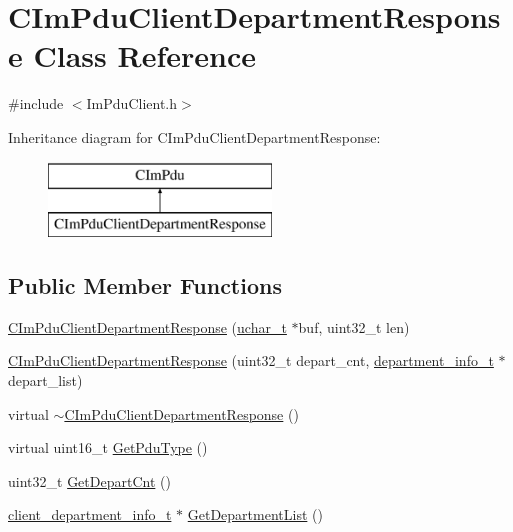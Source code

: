 \hypertarget{class_c_im_pdu_client_department_response}{}\section{C\+Im\+Pdu\+Client\+Department\+Response Class Reference}
\label{class_c_im_pdu_client_department_response}


{\ttfamily \#include $<$Im\+Pdu\+Client.\+h$>$}

Inheritance diagram for C\+Im\+Pdu\+Client\+Department\+Response\+:\begin{figure}[H]
\begin{center}
\leavevmode
\includegraphics[height=2.000000cm]{class_c_im_pdu_client_department_response}
\end{center}
\end{figure}
\subsection*{Public Member Functions}
\begin{DoxyCompactItemize}
\item 
\hyperlink{class_c_im_pdu_client_department_response_a4811df7c2580eef5515586ff06a02d8c}{C\+Im\+Pdu\+Client\+Department\+Response} (\hyperlink{base_2ostype_8h_a124ea0f8f4a23a0a286b5582137f0b8d}{uchar\+\_\+t} $\ast$buf, uint32\+\_\+t len)
\item 
\hyperlink{class_c_im_pdu_client_department_response_a0ad62adacbdd8a31988e3664ceaebb8d}{C\+Im\+Pdu\+Client\+Department\+Response} (uint32\+\_\+t depart\+\_\+cnt, \hyperlink{structdepartment__info__t}{department\+\_\+info\+\_\+t} $\ast$depart\+\_\+list)
\item 
virtual \hyperlink{class_c_im_pdu_client_department_response_a05db0f8313581813967f674a94c3890e}{$\sim$\+C\+Im\+Pdu\+Client\+Department\+Response} ()
\item 
virtual uint16\+\_\+t \hyperlink{class_c_im_pdu_client_department_response_aeed875fa9837f6efb94f3cc8d5467d20}{Get\+Pdu\+Type} ()
\item 
uint32\+\_\+t \hyperlink{class_c_im_pdu_client_department_response_a57d7762cde30b24e980f4e3ac6969bf5}{Get\+Depart\+Cnt} ()
\item 
\hyperlink{structclient__department__info__t}{client\+\_\+department\+\_\+info\+\_\+t} $\ast$ \hyperlink{class_c_im_pdu_client_department_response_a52145c9c90bfa54a438b0b6e4ea05aef}{Get\+Department\+List} ()
\end{DoxyCompactItemize}
